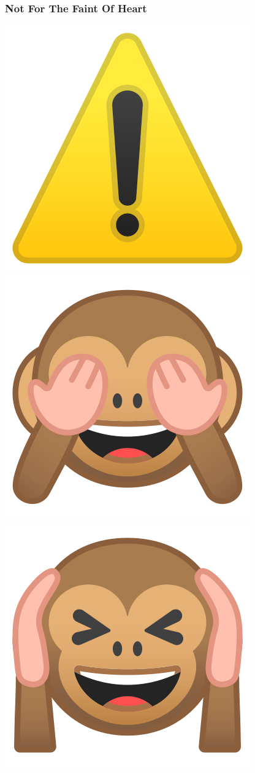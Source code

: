 \documentclass[aspectratio=169]{beamer}
\begin{document}
\begin{frame}
  \frametitle{Not For The Faint Of Heart}
  \begin{center}
    \includegraphics{static-images/warning.png}
    \includegraphics{static-images/see-no-evil.png}
    \includegraphics{static-images/hear-no-evil.png}

\end{center}
\end{frame}
\end{document}

